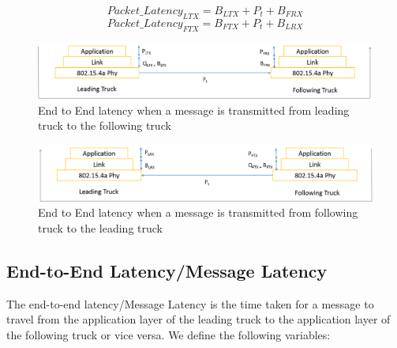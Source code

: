 \begin{equation}
Packet\_Latency_{LTX} = B_{LTX}  +  P_{t} +  B_{FRX}
\label{eq: packetLatencyLeading}
\end{equation}
\begin{equation}
Packet\_Latency_{FTX} = B_{FTX}  +  P_{t} +  B_{LRX}
\label{eq: packetLatencyFollowing}
\end{equation}
\begin{figure}[h!]
	\includegraphics[width=1\textwidth]{figures/messageLatencyLeadingtoFollowing.png}
	\centering
	\caption{End to End latency when a message is transmitted from leading truck to the following truck}
	\label{fig:messageLatencyLeadingtoFollowing}    
\end{figure}
\begin{figure}[h!]
	\includegraphics[width=1\textwidth]{figures/messageLatencyFollowingtoLeading.png}
	\centering
	\caption{End to End latency when a message is transmitted from following truck to the leading truck}
	\label{fig:messageLatencyFollowingtoLeading}    
\end{figure}

\subsection{End-to-End Latency/Message Latency}
The end-to-end latency/Message Latency is the time taken for a message to travel from the application layer of the leading truck to the application layer of the following truck or vice versa. We define the following variables:

